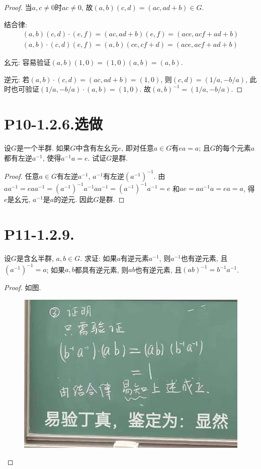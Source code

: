 \documentclass[12pt, a4paper, fontset=windows]{ctexart}
\newcommand{\xuan}{{\normalsize 选做}}
\begin{document}
\begin{proof}
当$a,c\ne 0$时$ac\ne 0$, 故$(a,b)(c,d)=(ac,ad+b)\in G$. 

结合律: 
\begin{gather*}
(a,b)(c,d)\cdot(e,f)=(ac,ad+b)(e,f)=(ace,acf+ad+b)\\
(a,b)\cdot(c,d)(e,f)=(a,b)(ce,cf+d)=(ace,acf+ad+b)
\end{gather*}

幺元: 
容易验证$(a,b)(1,0)=(1,0)(a,b)=(a,b)$. 

逆元: 
若$(a,b)\cdot(c,d)=(ac,ad+b)=(1,0)$, 则$(c,d)=(1/a,-b/a)$, 
此时也可验证$(1/a,-b/a)\cdot(a,b)=(1,0)$. 故$(a,b)^{-1}=(1/a,-b/a)$. 
\end{proof}

\section*{P10-1.2.6.\xuan}

设$G$是一个半群. 如果$G$中含有左幺元$e$, 即对任意$a\in G$有$ea=a$; 
且$G$的每个元素$a$都有左逆$a^{-1}$, 使得$a^{-1}a=e$. 试证$G$是群. 

\begin{proof}
任意$a\in G$有左逆$a^{-1}$, $a^{-1}$有左逆$(a^{-1})^{-1}$. 
由$aa^{-1}=eaa^{-1}=(a^{-1})^{-1}a^{-1}aa^{-1}=(a^{-1})^{-1}a^{-1}=e$
和$ae=aa^{-1}a=ea=a$, 得$e$是幺元, $a^{-1}$是$a$的逆元. 
因此$G$是群. 
\end{proof}

\section*{P11-1.2.9.}

设$G$是含幺半群, $a,b\in G$. 求证: 
如果$a$有逆元素$a^{-1}$, 则$a^{-1}$也有逆元素, 且$(a^{-1})^{-1}=a$; 
如果$a,b$都具有逆元素, 则$ab$也有逆元素, 且$(ab)^{-1}=b^{-1}a^{-1}$. 

\begin{proof}
如图. 

\begin{figure}[!htbp]
\centering
\includegraphics[width=.4\textwidth]{figs/yydz.jpg}
\end{figure}

\end{proof}
\end{document}
